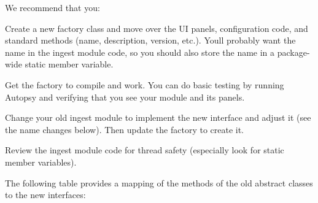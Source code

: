 We recommend that you\+:
\begin{DoxyEnumerate}
\item Create a new factory class and move over the UI panels, configuration code, and standard methods (name, description, version, etc.). You\textquotesingle{}ll probably want the name in the ingest module code, so you should also store the name in a package-\/wide static member variable.
\item Get the factory to compile and work. You can do basic testing by running Autopsy and verifying that you see your module and its panels.
\item Change your old ingest module to implement the new interface and adjust it (see the name changes below). Then update the factory to create it.
\item Review the ingest module code for thread safety (especially look for static member variables).
\end{DoxyEnumerate}

The following table provides a mapping of the methods of the old abstract classes to the new interfaces\+:

